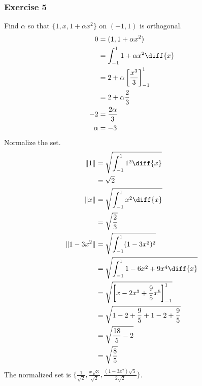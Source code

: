 \documentclass{math}
\begin{document}
\subsubsection*{Exercise 5}
Find \( \alpha \) so that \( \{1,x,1+\alpha x^2\} \) on \( (-1,1) \) is
orthogonal.
\begin{align*}
  0 &= (1,1+\alpha x^2) \\
  &= \int_{-1}^{1}1+\alpha x^2\diff{x} \\
  &= 2+\alpha\left[\frac{x^3}{3}\right]_{-1}^{1} \\
  &= 2+\alpha\frac{2}{3} \\
  -2 &= \frac{2\alpha}{3} \\
  \alpha &= -3
\end{align*}
Normalize the set.
\begin{align*}
  \|1\| &= \sqrt{\int_{-1}^{1}1^2\diff{x}} \\
  &= \sqrt{2} \\
  \|x\| &= \sqrt{\int_{-1}^{1}x^2\diff{x}} \\
  &= \sqrt{\frac{2}{3}} \\
  \|1-3x^2\| &= \sqrt{\int_{-1}^{1}(1-3x^2)^2} \\
  &= \sqrt{\int_{-1}^{1}1-6x^2+9x^4\diff{x}} \\
  &= \sqrt{\left[x-2x^3+\frac{9}{5}x^5\right]_{-1}^{1}} \\
  &= \sqrt{1-2+\frac{9}{5}+1-2+\frac{9}{5}} \\
  &= \sqrt{\frac{18}{5}-2} \\
  &= \sqrt{\frac{8}{5}}
\end{align*}
The normalized set is \( \{\frac{1}{\sqrt{2}},\frac{x\sqrt{3}}{\sqrt{2}},
\frac{(1-3x^2)\sqrt{5}}{2\sqrt{2}}\} \).
\end{document}
